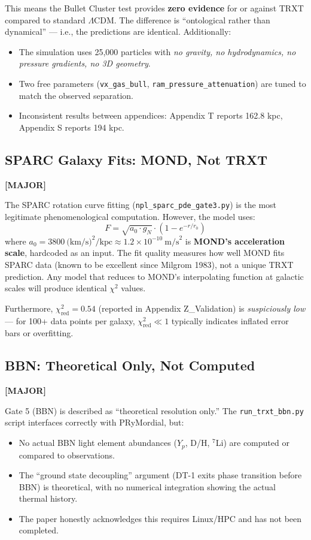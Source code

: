 \documentclass[12pt, a4paper]{article}
\newcommand{\major}{\textcolor{major}{\textbf{[MAJOR]}}}
\begin{document}
This means the Bullet Cluster test provides \textbf{zero evidence} for or against TRXT compared to standard $\Lambda$CDM. The difference is ``ontological rather than dynamical'' --- i.e., the predictions are identical. Additionally:
\begin{itemize}
    \item The simulation uses 25,000 particles with \emph{no gravity, no hydrodynamics, no pressure gradients, no 3D geometry}.
    \item Two free parameters (\texttt{vx\_gas\_bull}, \texttt{ram\_pressure\_attenuation}) are tuned to match the observed separation.
    \item Inconsistent results between appendices: Appendix T reports 162.8 kpc, Appendix S reports 194 kpc.
\end{itemize}

\subsection{SPARC Galaxy Fits: MOND, Not TRXT}
\major{}

The SPARC rotation curve fitting (\texttt{npl\_sparc\_pde\_gate3.py}) is the most legitimate phenomenological computation. However, the model uses:
\begin{equation}
    F = \sqrt{a_0 \cdot g_N} \cdot (1 - e^{-r/r_0})
\end{equation}
where $a_0 = 3800\ \text{(km/s)}^2/\text{kpc} \approx 1.2 \times 10^{-10}\ \text{m/s}^2$ is \textbf{MOND's acceleration scale}, hardcoded as an input. The fit quality measures how well MOND fits SPARC data (known to be excellent since Milgrom 1983), not a unique TRXT prediction. Any model that reduces to MOND's interpolating function at galactic scales will produce identical $\chi^2$ values.

Furthermore, $\chi^2_{\text{red}} = 0.54$ (reported in Appendix Z\_Validation) is \emph{suspiciously low} --- for 100+ data points per galaxy, $\chi^2_{\text{red}} \ll 1$ typically indicates inflated error bars or overfitting.

\subsection{BBN: Theoretical Only, Not Computed}
\major{}

Gate 5 (BBN) is described as ``theoretical resolution only.'' The \texttt{run\_trxt\_bbn.py} script interfaces correctly with PRyMordial, but:
\begin{itemize}
    \item No actual BBN light element abundances ($Y_p$, D/H, $^7$Li) are computed or compared to observations.
    \item The ``ground state decoupling'' argument (DT-1 exits phase transition before BBN) is theoretical, with no numerical integration showing the actual thermal history.
    \item The paper honestly acknowledges this requires Linux/HPC and has not been completed.
\end{itemize}
\end{document}
